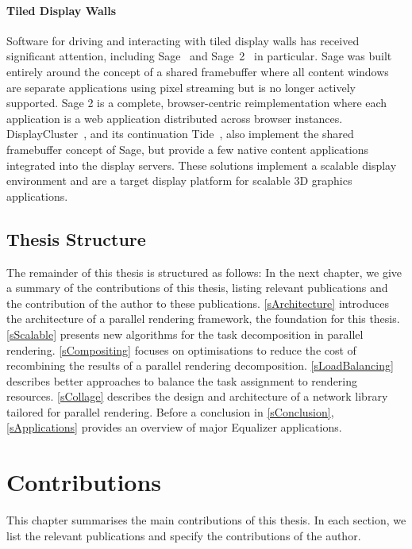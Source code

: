\subsubsection{Tiled Display Walls}

Software for driving and interacting with tiled display walls has received
significant attention, including {Sage}~\cite{Sage} and
 {Sage~2}~\cite{Sage2} in particular. {Sage} was built entirely
around the concept of a shared framebuffer where all content windows are
separate applications using pixel streaming but is no longer actively supported.
{Sage 2} is a complete, browser-centric reimplementation where each
application is a web application distributed across browser instances.
{DisplayCluster}~\cite{DisplayCluster}, and its continuation
 {Tide}~\cite{tide}, also implement the shared framebuffer concept of
 {Sage}, but provide a few native content applications integrated into the
display servers. These solutions implement a scalable display environment and
are a target display platform for scalable 3D graphics applications.

\section{Thesis Structure}

The remainder of this thesis is structured as follows: In the next chapter, we
give a summary of the contributions of this thesis, listing relevant
publications and the contribution of the author to these publications.
\cref{sArchitecture} introduces the architecture of a parallel rendering
framework, the foundation for this thesis. \cref{sScalable} presents new
algorithms for the task decomposition in parallel rendering.
\cref{sCompositing} focuses on optimisations to reduce the cost of recombining
the results of a parallel rendering decomposition. \cref{sLoadBalancing}
describes better approaches to balance the task assignment to rendering
resources. \cref{sCollage} describes the design and architecture of a network
library tailored for parallel rendering. Before a conclusion in
\cref{sConclusion}, \cref{sApplications} provides an overview of major
Equalizer applications.


\chapter{Contributions}

This chapter summarises the main contributions of this thesis. In each section,
we list the relevant publications and specify the contributions of the author.

